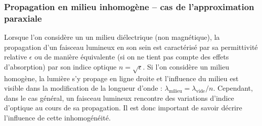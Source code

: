 \documentclass[a4paper,11pt]{article} %
\begin{document}
	\subsubsection{Propagation en milieu inhomogène -- cas de l'approximation paraxiale}
	Lorsque l'on considère un un milieu diélectrique (non magnétique), la propagation d'un faisceau lumineux en son sein est caractérisé par sa permittivité relative $ \epsilon $ ou de manière équivalente (si on ne tient pas compte des effets d'absorption) par son indice optique $ n = \sqrt{\epsilon} $. Si l'on considère un milieu homogène, la lumière s'y propage en ligne droite et l'influence du milieu est visible dans la modification de la longueur d'onde : $ \lambda_\text{milieu} = \lambda_\text{vide} / n $. Cependant, dans le cas général, un faisceau lumineux rencontre des variations d'indice d'optique au cours de sa propagation. Il est donc important de savoir décrire l'influence de cette inhomogénéité.\\
	
\end{document}
